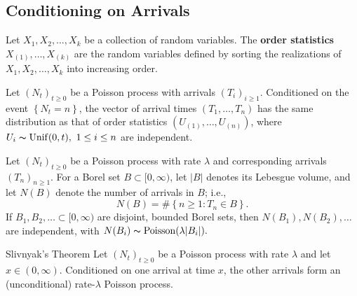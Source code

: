 \subsection{Conditioning on Arrivals}

\begin{defn}{}{}
Let \(X_{1}, X_{2}, \dots , X_{k}   \) be a collection of random variables. The \textbf{order statistics} \(X_{(1)}, \dots , X_{(k)}\) are the random variables defined by sorting the realizations of \(X_{1}, X_{2}, \dots , X_{k}   \) into increasing order. 

\end{defn}

\begin{thrm}{}{}
Let \((N_{t} )_{t \geq 0}\) be a Poisson process with arrivals \((T_{i} )_{i \geq 1}\). Conditioned on the event \(\left\{ N_{t} = n \right\} \), the vector of arrival times \((T_1, \dots , T_{n} )\) has the same distribution as that of order statistics \((U_{(1)}, \dots , U_{(n)})\), where \(U_{i} \thicksim \mathrm{Unif}(0,t), \ 1 \leq i \leq n \) are independent. 
\end{thrm}

\begin{thrm}{}{}
Let \((N_{t} )_{t\geq 0}\) be a Poisson process with rate \(\lambda \) and corresponding arrivals \((T_{n} )_{n\geq 1}\). For a Borel set \(B \subset [0, \infty )\), let \(|B|\) denotes its Lebesgue volume, and let \(N(B)\) denote the number of arrivals in \(B\); i.e., 
\[
    N(B) = \# \left\{ n\geq 1: T_{n}  \in B \right\}. 
\]
If \(B_{1}, B_2,\dots  \subset [0, \infty )\) are disjoint, bounded Borel sets, then \(N(B_1),N(B_2), \dots \) are independent, with \(N(B_{i} ) \thicksim \mathrm{Poisson}(\lambda |B_{i} |) . \) 
\end{thrm}

\begin{thrm}{Slivnyak's Theorem}{}
Let \((N_{t} )_{t \geq 0 }\) be a Poisson process with rate \(\lambda \) and let \(x \in  (0, \infty )\). Conditioned on one arrival at time \(x\), the other arrivals form an (unconditional) rate-\(\lambda \) Poisson process. 
\end{thrm}